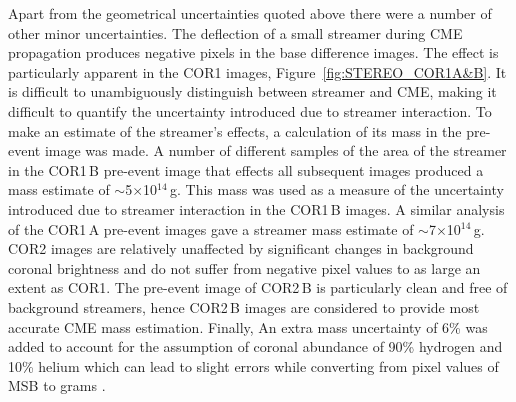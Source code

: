 
Apart from the geometrical uncertainties quoted above there were a number of other minor uncertainties. The deflection of a small streamer during CME propagation produces negative pixels in the base difference images. The effect is particularly apparent in the COR1 images, Figure~\ref{fig:STEREO_COR1A&B}. It is difficult to unambiguously distinguish between streamer and CME, making it difficult to quantify the uncertainty introduced due to streamer interaction. To make an estimate of the streamer's effects, a calculation of its mass in the pre-event image was made. A number of different samples of the area of the streamer in the COR1\,B pre-event image that effects all subsequent images produced a mass estimate of $\sim$5$\times$10$^{14}$\,g. This mass was used as a measure of the uncertainty introduced due to streamer interaction in the COR1\,B images. A similar analysis of the COR1\,A pre-event images gave a streamer mass estimate of $\sim$7$\times$10$^{14}$\,g. COR2 images are relatively unaffected by significant changes in background coronal brightness and do not suffer from negative pixel values to as large an extent as COR1. The pre-event image of COR2\,B is particularly clean and free of background streamers, hence COR2\,B images are considered to provide most accurate CME mass estimation. Finally, An extra mass uncertainty of 6\% was added to account for the assumption of coronal abundance of 90\% hydrogen and 10\% helium which can lead to slight errors while converting from pixel values of MSB to grams \citep{vour2010}. 

